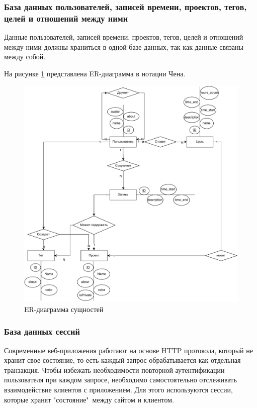 \subsubsection*{База данных пользователей, записей времени, проектов, тегов, целей  и отношений между ними}
Данные пользователей, записей времени, проектов, тегов, целей  и отношений между ними должны храниться в одной базе данных, так как данные связаны между собой.

На рисунке \ref{fig:ER} представлена ER-диаграмма в нотации Чена.


\begin{figure}[hbtp]
	\centering
	\includegraphics[width=\textwidth]{img/ER.drawio.pdf}
	\caption{ER-диаграмма сущностей}
	\label{fig:ER}
\end{figure}

\subsubsection*{База данных сессий} \label{5000}

Современные веб-приложения работают на основе HTTP протокола, который не хранит свое состояние, то есть каждый запрос обрабатывается как отдельная транзакция. Чтобы избежать необходимости повторной аутентификации пользователя при каждом запросе, необходимо самостоятельно отслеживать взаимодействие клиентов с приложением. Для этого используются сес\-сии\cite{sessions}, которые хранят "состояние"\ между сайтом и клиентом. 

